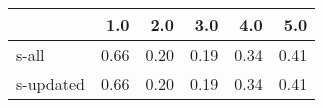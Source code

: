 \begin{tabular}{lrrrrr}
\toprule
{} &  1.0 &  2.0 &  3.0 &  4.0 &  5.0 \\
\midrule
s-all     & 0.66 & 0.20 & 0.19 & 0.34 & 0.41 \\
s-updated & 0.66 & 0.20 & 0.19 & 0.34 & 0.41 \\
\bottomrule
\end{tabular}
